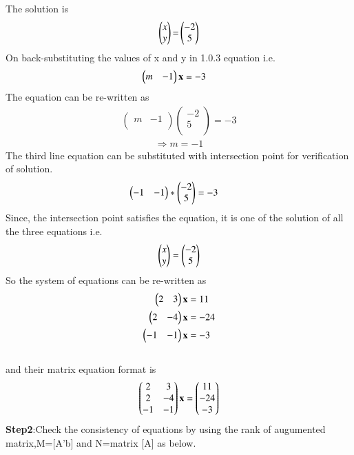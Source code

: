 \documentclass[journal,12pt,twocolumn]{IEEEtran}
\begin{document}
The solution is\\
\begin{align}
\begin{pmatrix}x\\y\end{pmatrix}\mathbf{=}\begin{pmatrix}-2\\5\end{pmatrix}
\end{align}
On back-substituting the values of x and y in 1.0.3 equation i.e.\\
\begin{align}
\begin{pmatrix}m & -1 \end{pmatrix}\mathbf{x}&=-3
\end{align}
The equation can be re-written as\\
\begin{align*}
\begin{pmatrix}m & -1\\\end{pmatrix} \begin{pmatrix}-2\\5\\\end{pmatrix}=-3
\end{align*}
\begin{align}
\Rightarrow m=-1
\end{align}
The third line equation can be substituted with intersection point for verification of solution.
\begin{align*}
\begin{pmatrix}-1 & -1\end{pmatrix}&*\begin{pmatrix}-2\\5\end{pmatrix}=-3
\end{align*}
Since, the intersection point satisfies the equation, it is one of the solution of all the three equations i.e.
\begin{align*}
\begin{pmatrix}x\\y\end{pmatrix}=\begin{pmatrix}-2\\5\end{pmatrix}
\end{align*}
So the system of equations can be re-written as\\
\begin{align}
\begin{pmatrix}2 & 3 \end{pmatrix}\mathbf{x}&=11\\
\begin{pmatrix}2 & -4 \end{pmatrix}\mathbf{x}&=-24\\
\begin{pmatrix}-1 & -1 \end{pmatrix}\mathbf{x}&=-3
\end{align}
\\
and their matrix equation format is
\begin{align}
\begin{pmatrix}2 & 3\\2 & -4\\-1 & -1\end{pmatrix}
\mathbf{x}=
\begin{pmatrix}11\\-24\\-3\end{pmatrix}
\end{align}
\textbf{Step2}:Check the consistency of equations by using the rank of augumented matrix,M=[A'b] and N=matrix [A] as below.
\end{document}
